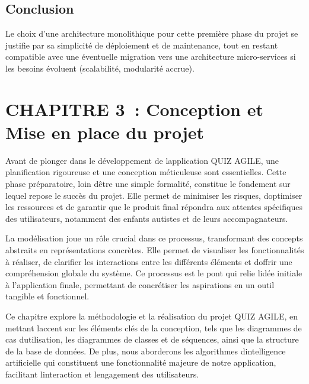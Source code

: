 \documentclass[12pt,a4paper,twoside]{report}
\begin{document}
\hypertarget{conclusion-1}{%
\subsection{Conclusion~}\label{conclusion-1}}

Le choix d'une architecture monolithique pour cette première phase du
projet se justifie par sa simplicité de déploiement et de maintenance,
tout en restant compatible avec une éventuelle migration vers une
architecture micro-services si les besoins évoluent (scalabilité,
modularité accrue).

\hypertarget{section-3}{%
\section{}\label{section-3}}

\hypertarget{chapitre-3-conception-et-mise-en-place-du-projet}{%
\section{CHAPITRE 3~: Conception et Mise en place du
projet}\label{chapitre-3-conception-et-mise-en-place-du-projet}}

Avant de plonger dans le développement de l\textquotesingle application
QUIZ AGILE, une planification rigoureuse et une conception méticuleuse
sont essentielles. Cette phase préparatoire, loin d\textquotesingle être
une simple formalité, constitue le fondement sur lequel repose le succès
du projet. Elle permet de minimiser les risques,
d\textquotesingle optimiser les ressources et de garantir que le produit
final répondra aux attentes spécifiques des utilisateurs, notamment des
enfants autistes et de leurs accompagnateurs.

La modélisation joue un rôle crucial dans ce processus, transformant des
concepts abstraits en représentations concrètes. Elle permet de
visualiser les fonctionnalités à réaliser, de clarifier les interactions
entre les différents éléments et d\textquotesingle offrir une
compréhension globale du système. Ce processus est le pont qui relie
l\textquotesingle idée initiale à l'application finale, permettant de
concrétiser les aspirations en un outil tangible et fonctionnel.

Ce chapitre explore la méthodologie et la réalisation du projet QUIZ
AGILE, en mettant l\textquotesingle accent sur les éléments clés de la
conception, tels que les diagrammes de cas
d\textquotesingle utilisation, les diagrammes de classes et de
séquences, ainsi que la structure de la base de données. De plus, nous
aborderons les algorithmes d\textquotesingle intelligence artificielle
qui constituent une fonctionnalité majeure de notre application,
facilitant l\textquotesingle interaction et l\textquotesingle engagement
des utilisateurs.
\end{document}
